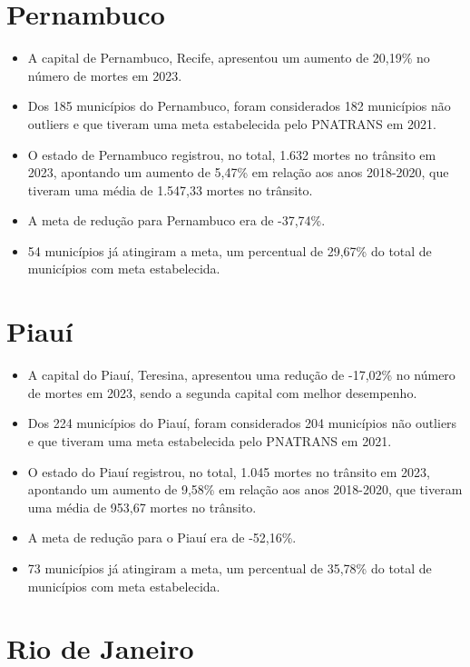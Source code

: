 \documentclass[
  letterpaper,
  DIV=11,
  numbers=noendperiod]{scrreprt}
\begin{document}
\section{Pernambuco}\label{pernambuco}

\begin{itemize}
\item
  A capital de Pernambuco, Recife, apresentou um aumento de 20,19\% no
  número de mortes em 2023.
\item
  Dos 185 municípios do Pernambuco, foram considerados 182 municípios
  não outliers e que tiveram uma meta estabelecida pelo PNATRANS em
  2021.
\item
  O estado de Pernambuco registrou, no total, 1.632 mortes no trânsito
  em 2023, apontando um aumento de 5,47\% em relação aos anos 2018-2020,
  que tiveram uma média de 1.547,33 mortes no trânsito.
\item
  A meta de redução para Pernambuco era de -37,74\%.
\item
  54 municípios já atingiram a meta, um percentual de 29,67\% do total
  de municípios com meta estabelecida.
\end{itemize}

\section{Piauí}\label{piauuxed}

\begin{itemize}
\item
  A capital do Piauí, Teresina, apresentou uma redução de -17,02\% no
  número de mortes em 2023, sendo a segunda capital com melhor
  desempenho.
\item
  Dos 224 municípios do Piauí, foram considerados 204 municípios não
  outliers e que tiveram uma meta estabelecida pelo PNATRANS em 2021.
\item
  O estado do Piauí registrou, no total, 1.045 mortes no trânsito em
  2023, apontando um aumento de 9,58\% em relação aos anos 2018-2020,
  que tiveram uma média de 953,67 mortes no trânsito.
\item
  A meta de redução para o Piauí era de -52,16\%.
\item
  73 municípios já atingiram a meta, um percentual de 35,78\% do total
  de municípios com meta estabelecida.
\end{itemize}

\section{Rio de Janeiro}\label{rio-de-janeiro}
\end{document}
